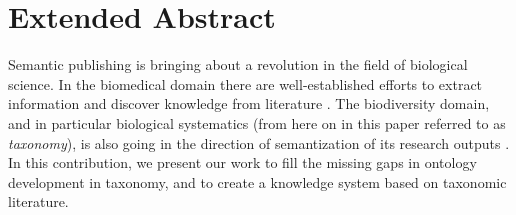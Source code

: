 \documentclass{bmcart}
\begin{document}
\begin{frontmatter}
\begin{abstractbox}
\begin{keyword}
\end{keyword}


\end{abstractbox}
%

\end{frontmatter}



\section{Extended Abstract}

Semantic publishing is bringing about a revolution in the field of biological science. In the biomedical domain there are well-established efforts to extract information and discover knowledge from literature \cite{momtchev_expanding_2009, williams_open_2012, rebholz-schuhmann_facts_2005}. The biodiversity domain, and in particular biological systematics (from here on in this paper referred to as \emph{taxonomy}), is also going in the direction of semantization of its research outputs \cite{tzitzikas_integrating_2013,senderov_open_2016,penev_fast_2010}. In this contribution, we present our work to fill the missing gaps in ontology development in taxonomy, and to create a knowledge system based on taxonomic literature.
\end{document}
